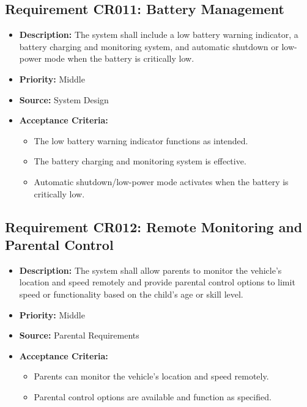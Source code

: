 \documentclass{article}
\begin{document}
	\subsection{Requirement CR011: Battery Management}
	\begin{itemize}
		\item \textbf{Description:} The system shall include a low battery warning indicator, a battery charging and monitoring system, and automatic shutdown or low-power mode when the battery is critically low.
		\item \textbf{Priority:} Middle
		\item \textbf{Source:} System Design
		\item \textbf{Acceptance Criteria:}
		\begin{itemize}
			\item The low battery warning indicator functions as intended.
			\item The battery charging and monitoring system is effective.
			\item Automatic shutdown/low-power mode activates when the battery is critically low.
		\end{itemize}
	\end{itemize}
	
	\subsection{Requirement CR012: Remote Monitoring and Parental Control}
	\begin{itemize}
		\item \textbf{Description:} The system shall allow parents to monitor the vehicle's location and speed remotely and provide parental control options to limit speed or functionality based on the child's age or skill level.
		\item \textbf{Priority:} Middle
		\item \textbf{Source:} Parental Requirements
		\item \textbf{Acceptance Criteria:}
		\begin{itemize}
			\item Parents can monitor the vehicle's location and speed remotely.
			\item Parental control options are available and function as specified.
		\end{itemize}
	\end{itemize}
	
\end{document}
